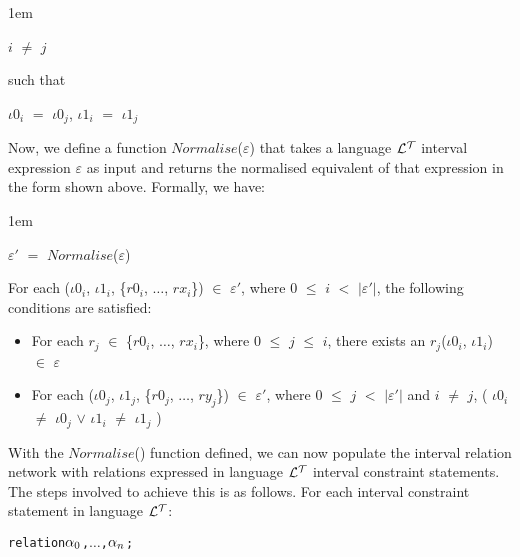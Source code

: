 \documentclass[11pt]{report}
\newenvironment{vverbatim}
{
  \begin{alltt}
}
{
  \vspace{-\baselineskip}
  \end{alltt}
}
\newenvironment{vquote}
{
  \begin{list}{}{\leftmargin 1em}\item[]
}
{
  \end{list}
}
\begin{document}
\begin{itemize}
\begin{vquote}
                $i$ $\neq$ $j$

                such that

                ${\iota}0_i$ $=$ ${\iota}0_j$,
                ${\iota}1_i$ $=$ ${\iota}1_j$
              \end{vquote}

              Now, we define a function $Normalise$($\varepsilon$) that takes
              a language ${\cal L^T}$ interval expression $\varepsilon$ as
              input and returns the normalised equivalent of that expression in
              the form shown above. Formally, we have:

              \begin{vquote}
                ${\varepsilon}'$ $=$ $Normalise$($\varepsilon$)
              \end{vquote}

              \noindent
              For each
              (${\iota}0_i$, ${\iota}1_i$, \{$r0_i$, $\ldots$, $rx_i$\})
              $\in$ ${\varepsilon}'$,
              where $0$ $\leq$ $i$ $<$ $|{\varepsilon}'|$, the following
              conditions are satisfied:

              \begin{itemize}
                \item
                  For each $r_j$ $\in$ \{$r0_i$, $\ldots$, $rx_i$\}, where $0$
                  $\leq$ $j$ $\leq$ $i$, there exists an
                  $r_j$(${\iota}0_i$, ${\iota}1_i$) $\in$ $\varepsilon$

                \item
                  For each 
                  (${\iota}0_j$, ${\iota}1_j$, \{$r0_j$, $\ldots$, $ry_j$\})
                  $\in$ ${\varepsilon}'$, where $0$ $\leq$ $j$ $<$
                  $|{\varepsilon}'|$ and $i$ $\neq$ $j$, 
                  (
                    ${\iota}0_i$ $\neq$ ${\iota}0_j$ $\lor$
                    ${\iota}1_i$ $\neq$ ${\iota}1_j$
                  )
              \end{itemize}

              With the $Normalise$() function defined, we can now populate the
              interval relation network with relations expressed in language
              ${\cal L^T}$ interval constraint statements. The steps involved
              to achieve this is as follows. For each interval constraint
              statement in language ${\cal L^T}$:

              \begin{vverbatim}
  relation \(\alpha\sb{0}\), \(\ldots\), \(\alpha\sb{n}\);
              \end{vverbatim}


\end{itemize}
\end{document}
